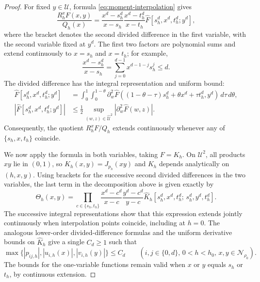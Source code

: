 \begin{proof}
For fixed $y\in\mathcal U$, formula \eqref{eq:moment-interpolation} gives
\begin{equation*}
  \frac{R_h^xF(x,y)}{Q_h(x)}
  =\frac{x^d-s_h^d}{x-s_h}\frac{x^d-t_h^d}{x-t_h}
    \widehat F[s_h^d,x^d,t_h^d;y^d],
\end{equation*}
where the bracket denotes the second divided difference in the first
variable, with the second variable fixed at $y^d$.
The first two factors are polynomial sums and extend continuously to $x=s_h$
and $x=t_h$; for example,
\[
  \frac{x^d-s_h^d}{x-s_h}
  =\sum_{j=0}^{d-1}x^{d-1-j}s_h^j
  \le d.
\]
The divided difference has the integral representation and uniform bound:
\[
\begin{aligned}
  \widehat F[s_h^d,x^d,t_h^d;y^d]
  &=\int_0^1\int_0^{1-\theta}
    \partial_w^2\widehat F
    \!\left((1-\theta-\tau)s_h^d+\theta x^d+\tau t_h^d,y^d\right)\,d\tau\,d\theta,\\
  \left|\widehat F[s_h^d,x^d,t_h^d;y^d]\right|
  &\le \frac12\sup_{(w,z)\in\widehat{\mathcal U}^2}
    |\partial_w^2\widehat F(w,z)|.
\end{aligned}
\]
Consequently, the quotient $R_h^xF/Q_h$ extends continuously whenever any of
$\{s_h,x,t_h\}$ coincide.

We now apply the formula in both variables, taking $F=K_h$.  On
$\mathcal U^2$, all products $xy$ lie in $(0,1)$, so $K_h(x,y)=J_{p_h}(xy)$
and $K_h$ depends analytically on $(h,x,y)$.  Using brackets for the
successive second divided differences in the two variables, the last term in
the decomposition above is given exactly by
\[
  \Theta_h(x,y)
  =\prod_{c\in\{s_h,t_h\}}
    \frac{x^d-c^d}{x-c}\frac{y^d-c^d}{y-c}
    \widehat K_h[s_h^d,x^d,t_h^d;\,s_h^d,y^d,t_h^d].
\]
The successive integral representations show that this expression extends
jointly continuously when interpolation points coincide, including at
$h=0$.  The analogous lower-order divided-difference formulas and the uniform
derivative bounds on $\widehat K_h$ give a single $C_d\ge1$ such that
\[
  \max\bigl\{|p_{ij,h}|,|u_{i,h}(x)|,|v_{i,h}(y)|\bigr\}\le C_d
  \qquad  (i,j\in\{0,d\},\,0<h<h_0,\,x,y\in\mathcal N_{\rho_0}).
\]
The bounds for the one-variable functions remain valid when $x$ or $y$ equals
$s_h$ or $t_h$, by continuous extension.


\end{proof}
